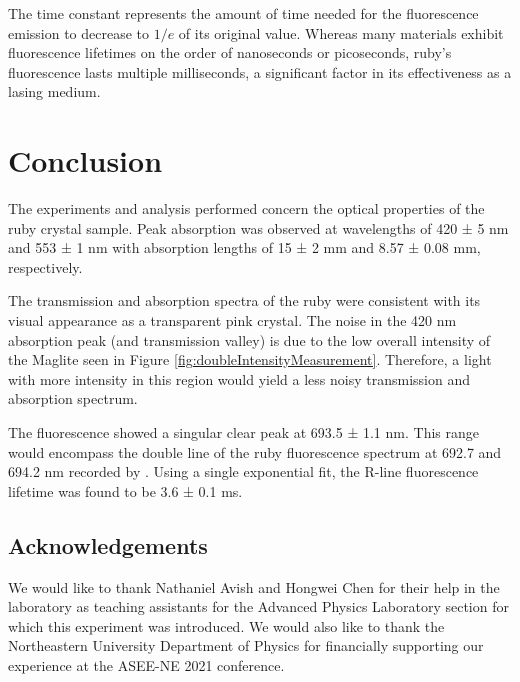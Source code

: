 \documentclass[11pt, a4paper, twocolumn]{article}
\begin{document}
The time constant represents the amount of time needed for the fluorescence emission to decrease to $1/e$ of its original value. Whereas many materials exhibit fluorescence lifetimes on the order of nanoseconds or picoseconds, ruby’s fluorescence lasts multiple milliseconds, a significant factor in its effectiveness as a lasing medium.

\section*{Conclusion}
The experiments and analysis performed concern the optical properties of the ruby crystal sample. Peak absorption was observed at wavelengths of 420 ± 5 nm and 553 ± 1 nm with absorption lengths of 15 ± 2 mm and 8.57 ± 0.08 mm, respectively. 

The transmission and absorption spectra of the ruby were consistent with its visual appearance as a transparent pink crystal. The noise in the 420 nm absorption peak (and transmission valley) is due to the low overall intensity of the Maglite seen in Figure \ref{fig:doubleIntensityMeasurement}. Therefore, a light with more intensity in this region would yield a less noisy transmission and absorption spectrum.

The fluorescence showed a singular clear peak at 693.5 ± 1.1 nm. This range would encompass the double line of the ruby fluorescence spectrum at 692.7 and 694.2 nm recorded by \cite{Kumari, Mani}. Using a single exponential fit, the R-line fluorescence lifetime was found to be 3.6 ± 0.1 ms.

\subsection*{Acknowledgements}
We would like to thank Nathaniel Avish and Hongwei Chen for their help in the laboratory as teaching assistants for the Advanced Physics Laboratory section for which this experiment was introduced. We would also like to thank the Northeastern University Department of Physics for financially supporting our experience at the ASEE-NE 2021 conference.
\nocite{*}

\footnotesize{}
\end{document}
